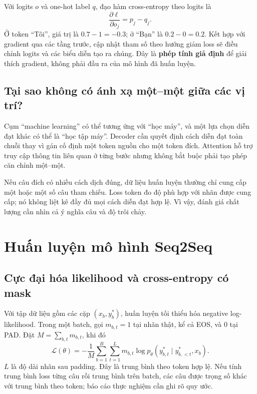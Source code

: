 \documentclass[11pt,a4paper]{article}
\numberwithin{equation}{section}
\begin{document}
Với logits $o$ và one-hot label $q$, đạo hàm cross-entropy theo logits là
\begin{equation}
\frac{\partial\ell}{\partial o_j}=p_j-q_j.
\end{equation}
Ở token ``Tôi'', giá trị là $0.7-1=-0.3$; ở ``Bạn'' là $0.2-0=0.2$. Kết hợp với gradient qua các tầng trước, cập nhật tham số theo hướng giảm loss sẽ điều chỉnh logits và các biểu diễn tạo ra chúng. Đây là \textbf{phép tính giả định} để giải thích gradient, không phải đầu ra của mô hình đã huấn luyện.

\subsection{Tại sao không có ánh xạ một--một giữa các vị trí?}
Cụm ``machine learning'' có thể tương ứng với ``học máy'', và một lựa chọn diễn đạt khác có thể là ``học tập máy''. Decoder cần quyết định cách diễn đạt toàn chuỗi thay vì gán cố định một token nguồn cho một token đích. Attention hỗ trợ truy cập thông tin liên quan ở từng bước nhưng không bắt buộc phải tạo phép căn chỉnh một--một.

Nếu câu đích có nhiều cách dịch đúng, dữ liệu huấn luyện thường chỉ cung cấp một hoặc một số câu tham chiếu. Loss token đo độ phù hợp với nhãn được cung cấp; nó không liệt kê đầy đủ mọi cách diễn đạt hợp lệ. Vì vậy, đánh giá chất lượng cần nhìn cả ý nghĩa câu và độ trôi chảy.

\clearpage
\section{Huấn luyện mô hình Seq2Seq}
\subsection{Cực đại hóa likelihood và cross-entropy có mask}
Với tập dữ liệu gồm các cặp $(x_b,y_b^*)$, huấn luyện tối thiểu hóa negative log-likelihood. Trong một batch, gọi $m_{b,t}=1$ tại nhãn thật, kể cả EOS, và $0$ tại PAD. Đặt $M=\sum_{b,t}m_{b,t}$, khi đó
\begin{equation}\label{eq:loss}
\mathcal L(\theta)=-\frac{1}{M}\sum_{b=1}^{B}\sum_{t=1}^{L}
m_{b,t}\log p_\theta(y_{b,t}^*\mid y_{b,<t}^*,x_b).
\end{equation}
$L$ là độ dài nhãn sau padding. Đây là trung bình theo token hợp lệ. Nếu tính trung bình loss từng câu rồi trung bình trên batch, các câu được trọng số khác với trung bình theo token; báo cáo thực nghiệm cần ghi rõ quy ước.
\end{document}
